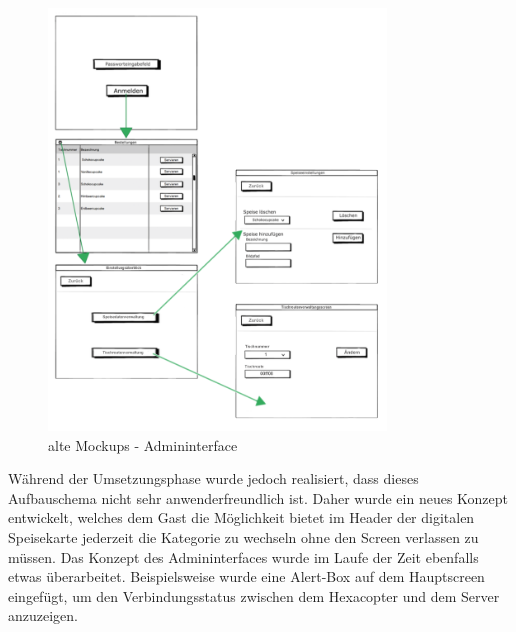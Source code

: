 			\begin{figure}[H]
			\begin{centering}
			\includegraphics[width = 0.8\textwidth]{Bilder/Jok_alte_mockups_admin}
			\par\end{centering}
			\caption{alte Mockups - Admininterface}
			\label{alte Mockups}
			\end{figure}Während der Umsetzungsphase wurde jedoch realisiert, dass dieses Aufbauschema nicht sehr anwenderfreundlich ist. Daher wurde ein neues Konzept entwickelt, welches dem Gast die Möglichkeit bietet im Header der digitalen Speisekarte jederzeit die Kategorie zu wechseln ohne den Screen verlassen zu müssen. Das Konzept des Admininterfaces wurde im Laufe der Zeit ebenfalls etwas überarbeitet. Beispielsweise wurde eine Alert-Box auf dem Hauptscreen eingefügt, um den Verbindungsstatus zwischen dem Hexacopter und dem Server anzuzeigen. \\

\pagebreak

